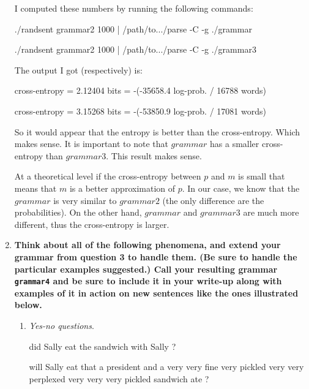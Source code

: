 \documentclass[10pt]{article}
\begin{document}
\begin{enumerate}
I computed these numbers by running the following commands:

{\tt

./randsent grammar2 1000 | /path/to.../parse -C -g ./grammar

./randsent grammar2 1000 | /path/to.../parse -C -g ./grammar3

}

The output I got (respectively) is:

{\tt

cross-entropy = 2.12404 bits = -(-35658.4 log-prob. / 16788 words)

cross-entropy = 3.15268 bits = -(-53850.9 log-prob. / 17081 words)

}

So it would appear that the entropy is better than the cross-entropy. Which makes sense. It is important to note that $grammar$ has a smaller cross-entropy than $grammar3$. This result makes sense. 

At a theoretical level if the cross-entropy between $p$ and $m$ is small that means that $m$ is a better approximation of $p$. In our case, we know that the $grammar$ is very similar to $grammar2$ (the only difference are the probabilities). On the other hand, $grammar$ and $grammar3$ are much more different, thus the cross-entropy is larger.


\item  {\bf Think about all of the following phenomena, and extend your grammar
  from question 3 to handle them. (Be sure to handle the particular
  examples suggested.)  Call your resulting grammar
  \verb|grammar4| and be sure to include it in your write-up along with examples of it
  in action on new sentences like the ones illustrated below.}

\begin{enumerate}

I have included sample outputs from the grammar below. I also tested to ensure all of the sentences and test case presented in the assignment pass. You can see the test case file in {\tt test.rb} in my source distribution. You can easily see if everything passes by running:

{\tt ./test.rb | grep failure}

\item {\it Yes-no questions}.

{\tt 

did Sally eat the sandwich with Sally ?

will Sally eat that a president and a very very fine very pickled very very perplexed very very very pickled sandwich ate ?

}
\end{enumerate}
\end{enumerate}
\end{document}
